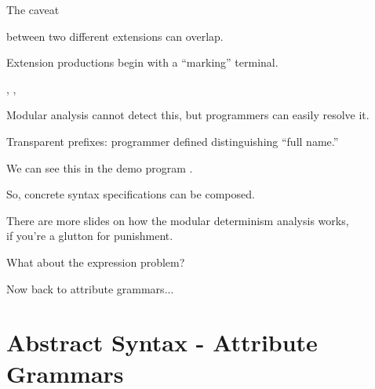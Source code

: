 \documentclass[notes,11pt,aspectratio=169]{beamer}
\begin{document}
\begin{frame}{The caveat}

 between two different extensions can overlap.

\biA
 \x Extension productions begin with a ``marking'' terminal.

    \bigskip
    \eg{} , , \code{/}

 \x Modular analysis cannot detect this, but programmers can easily
 resolve it.

 \x Transparent prefixes: programmer defined distinguishing ``full
    name.''

 \x We can see this in the demo program .
\ei

\end{frame}



\begin{frame}
So, concrete syntax specifications can be composed.

\bi
\x There are more slides on how the modular determinism analysis works, \\
   if you're a glutton for punishment.
\ei

\pause
\vskip 1cm
What about the expression problem?

\vskip 1cm
Now back to attribute grammars...
\end{frame}



\section{Abstract Syntax - Attribute Grammars}
\end{document}
